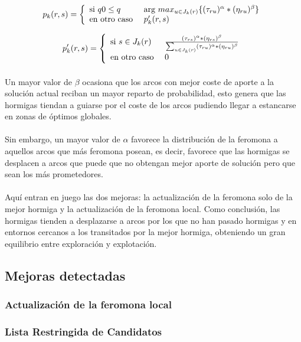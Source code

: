 	\begin{equation}
	p_{k}(r,s)= \left\lbrace
	\begin{array}{ll}
	\textup{si } q0 \leq q & \textup{arg }max_{u \in J_{k}(r)}\{(\tau_{ru})^{\alpha}*(\eta_{ru})^{\beta}\}\\
	\textup{en otro caso } & p'_{k}(r,s)
	\end{array}
	\right.
	\end{equation}
	
	\begin{equation}
	p'_{k}(r,s)= \left\lbrace
	\begin{array}{ll}
	\textup{si } s \in J_{k}(r) & \frac{(\tau_{rs})^{\alpha}*(\eta_{rs})^{\beta}}{\sum_{u \in J_{k}(r)}(\tau_{ru})^{\alpha}*(\eta_{ru})^{\beta}}\\
	\textup{en otro caso } & 0
	\end{array}
	\right.
	\end{equation}
	
	\paragraph{}Un mayor valor de $\beta$ ocasiona que los arcos con mejor coste de aporte a la solución actual reciban un mayor reparto de probabilidad, esto genera que las hormigas tiendan a guiarse por el coste de los arcos pudiendo llegar a estancarse en zonas de óptimos globales.
	
	\paragraph{}Sin embargo, un mayor valor de $\alpha$ favorece la distribución de la feromona a aquellos arcos que más feromona posean, es decir, favorece que las hormigas se desplacen a arcos que puede que no obtengan mejor aporte de solución pero que sean los más prometedores. 
	
	\paragraph{}Aquí entran en juego las dos mejoras: la actualización de la feromona solo de la mejor hormiga y la actualización de la feromona local. Como conclusión, las hormigas tienden a desplazarse a arcos por los que no han pasado hormigas y en entornos cercanos a los transitados por la mejor hormiga, obteniendo un gran equilibrio entre exploración y explotación.
	
	\subsection{Mejoras detectadas}
	
	\subsubsection{Actualización de la feromona local}
	
	\subsubsection{Lista Restringida de Candidatos}